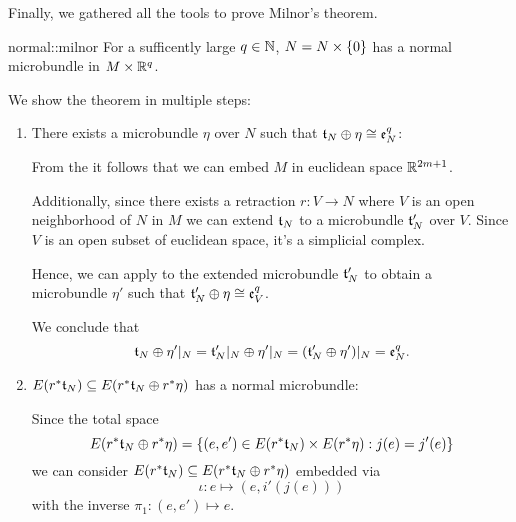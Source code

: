 \begin{scope}
    \newcommand{\rwhitney} {
        \whitney{\ind{r}\bt_N}{\ind{r}\eta}
    }
    \newcommand{\rtn} {
        \ind{r}\bt_N
    }

    \begin{myparagraph}
        Finally, we gathered all the tools to prove Milnor's theorem.
    \end{myparagraph}

    \begin{mytheorem}{normal::milnor}
        For a sufficently large $q \in \N$, $N = \cyldown{N}$ has a normal microbundle in $M \times \R^q$.
    \end{mytheorem}

    \begin{myproof}
        We show the theorem in multiple steps:
        \begin{enumerate}
            \item There exists a microbundle $\eta$ over $N$ such that $\whitney{\bt_N}{\eta} \cong \be[q]{N}$:
            
            From the  it follows that
            we can embed $M$ in euclidean space $\R^{2m + 1}$.

            Additionally, since there exists a retraction $r: V \to N$
            where $V$ is an open neighborhood of $N$ in $M$ we can extend $\bt_N$
            to a microbundle $\bt_N'$ over $V$.
            Since $V$ is an open subset of euclidean space, it's a simplicial complex.

            Hence, we can apply  to the extended microbundle $\bt_N'$
            to obtain a microbundle $\eta'$ such that $\whitney{\bt_N'}{\eta} \cong \be[q]{V}$.

            We conclude that
            \[
                \whitney{\bt_N}{\eta'\restr{N}}
                = \whitney{\bt_N'\restr{N}}{\eta'\restr{N}}
                = (\whitney{\bt_N'}{\eta'})\restr{N} = \be[q]{N}.
            \]

            \item $E(\rtn) \sub E(\rwhitney)$ has a normal microbundle:

            Since the total space
            \[ E(\rwhitney) = \set{(e, e') \in E(\rtn) \times E(\ind{r}\eta)}{j(e) = j'(e)} \]
            we can consider $E(\rtn) \sub E(\rwhitney)$ embedded via
            \[ \iota: e \mapsto (e, i'(j(e))) \]
            with the inverse $\pi_1: (e, e') \mapsto e$.


\end{enumerate}
\end{myproof}
\end{scope}
